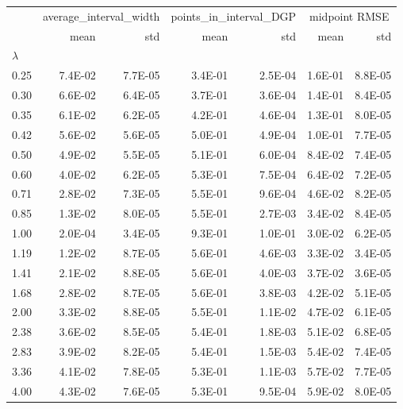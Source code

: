 \begin{tabular}{lrrrrrr}
 & \multicolumn{2}{c}{average_interval_width} & \multicolumn{2}{c}{points_in_interval_DGP} & \multicolumn{2}{c}{midpoint RMSE} \\
 & mean & std & mean & std & mean & std \\
$\lambda$ &  &  &  &  &  &  \\
0.25 & 7.4E-02 & 7.7E-05 & 3.4E-01 & 2.5E-04 & 1.6E-01 & 8.8E-05 \\
0.30 & 6.6E-02 & 6.4E-05 & 3.7E-01 & 3.6E-04 & 1.4E-01 & 8.4E-05 \\
0.35 & 6.1E-02 & 6.2E-05 & 4.2E-01 & 4.6E-04 & 1.3E-01 & 8.0E-05 \\
0.42 & 5.6E-02 & 5.6E-05 & 5.0E-01 & 4.9E-04 & 1.0E-01 & 7.7E-05 \\
0.50 & 4.9E-02 & 5.5E-05 & 5.1E-01 & 6.0E-04 & 8.4E-02 & 7.4E-05 \\
0.60 & 4.0E-02 & 6.2E-05 & 5.3E-01 & 7.5E-04 & 6.4E-02 & 7.2E-05 \\
0.71 & 2.8E-02 & 7.3E-05 & 5.5E-01 & 9.6E-04 & 4.6E-02 & 8.2E-05 \\
0.85 & 1.3E-02 & 8.0E-05 & 5.5E-01 & 2.7E-03 & 3.4E-02 & 8.4E-05 \\
1.00 & 2.0E-04 & 3.4E-05 & 9.3E-01 & 1.0E-01 & 3.0E-02 & 6.2E-05 \\
1.19 & 1.2E-02 & 8.7E-05 & 5.6E-01 & 4.6E-03 & 3.3E-02 & 3.4E-05 \\
1.41 & 2.1E-02 & 8.8E-05 & 5.6E-01 & 4.0E-03 & 3.7E-02 & 3.6E-05 \\
1.68 & 2.8E-02 & 8.7E-05 & 5.6E-01 & 3.8E-03 & 4.2E-02 & 5.1E-05 \\
2.00 & 3.3E-02 & 8.8E-05 & 5.5E-01 & 1.1E-02 & 4.7E-02 & 6.1E-05 \\
2.38 & 3.6E-02 & 8.5E-05 & 5.4E-01 & 1.8E-03 & 5.1E-02 & 6.8E-05 \\
2.83 & 3.9E-02 & 8.2E-05 & 5.4E-01 & 1.5E-03 & 5.4E-02 & 7.4E-05 \\
3.36 & 4.1E-02 & 7.8E-05 & 5.3E-01 & 1.1E-03 & 5.7E-02 & 7.7E-05 \\
4.00 & 4.3E-02 & 7.6E-05 & 5.3E-01 & 9.5E-04 & 5.9E-02 & 8.0E-05 \\
\end{tabular}
